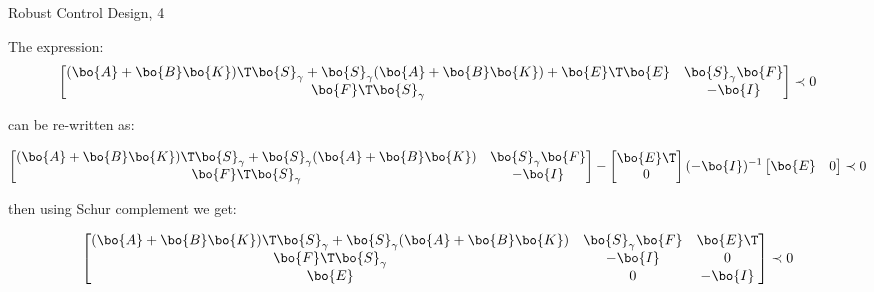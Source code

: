 \documentclass{beamer}
\begin{document}
\begin{frame}{Robust Control Design, 4}
	\begin{flushleft}
		
		The expression:
		$$\begin{bmatrix}
			(\bo{A} + \bo{B}\bo{K})\T\bo{S}_\gamma + \bo{S}_\gamma (\bo{A} + \bo{B}\bo{K}) + \bo{E}\T \bo{E} & \bo{S}_\gamma\bo{F} \\
			\bo{F}\T\bo{S}_\gamma & -\bo{I}
		\end{bmatrix} \prec 0$$ 
		
		can be re-written as:
		
		\begin{equation*}
			\begin{bmatrix}
				(\bo{A} + \bo{B}\bo{K})\T\bo{S}_\gamma + \bo{S}_\gamma (\bo{A} + \bo{B}\bo{K}) & \bo{S}_\gamma\bo{F} \\
				\bo{F}\T\bo{S}_\gamma & -\bo{I}
			\end{bmatrix} 
			-
			\begin{bmatrix}
				\bo{E}\T \\
				0
			\end{bmatrix} 
			(-\bo{I})^{-1}
			\begin{bmatrix}
				\bo{E} & 0
			\end{bmatrix} 
			\prec 0
		\end{equation*}		
		
		then using Schur complement we get:
		
		\begin{equation}
			\begin{bmatrix}
				(\bo{A} + \bo{B}\bo{K})\T\bo{S}_\gamma + \bo{S}_\gamma (\bo{A} + \bo{B}\bo{K}) & \bo{S}_\gamma\bo{F} & \bo{E}\T \\
				\bo{F}\T\bo{S}_\gamma & -\bo{I} & 0 \\
				\bo{E} & 0 & -\bo{I}
			\end{bmatrix} 
			\prec 0
		\end{equation}	
		
		
	\end{flushleft}
\end{frame}
\end{document}

